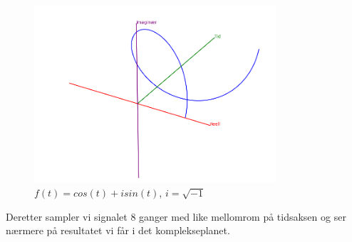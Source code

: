 \documentclass{article}
\begin{document}
            \begin{figure}[H]
                \centering
                \includegraphics[width = 0.8\textwidth]{Bilder/BasisEksempelFunksjon.png}
                \caption{\(f(t) = cos(t) + isin(t)\), \(i = \sqrt{-1}\)}
            \end{figure}

            Deretter sampler vi signalet 8 ganger med like mellomrom på tidsaksen og ser nærmere på resultatet vi får i det komplekseplanet.
\end{document}
